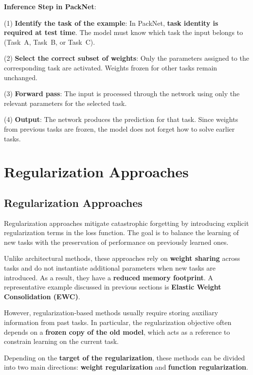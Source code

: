 \textbf{Inference Step in PackNet}:

(1) \textbf{Identify the task of the example}: In PackNet, \textbf{task identity is required at
test time}. The model must know which task the input belongs to (Task~A, Task~B, or Task~C).

(2) \textbf{Select the correct subset of weights}: Only the parameters assigned to the
corresponding task are activated. Weights frozen for other tasks remain unchanged.

(3) \textbf{Forward pass}: The input is processed through the network using only the relevant
parameters for the selected task.

(4) \textbf{Output}: The network produces the prediction for that task. Since weights from
previous tasks are frozen, the model does not forget how to solve earlier tasks.

\section{Regularization Approaches}
\subsection{Regularization Approaches}

Regularization approaches mitigate catastrophic forgetting by introducing explicit
regularization terms in the loss function. The goal is to balance the learning of new
tasks with the preservation of performance on previously learned ones.

Unlike architectural methods, these approaches rely on \textbf{weight sharing} across
tasks and do not instantiate additional parameters when new tasks are introduced.
As a result, they have a \textbf{reduced memory footprint}. A representative example
discussed in previous sections is \textbf{Elastic Weight Consolidation (EWC)}.

However, regularization-based methods usually require storing auxiliary information
from past tasks. In particular, the regularization objective often depends on a
\textbf{frozen copy of the old model}, which acts as a reference to constrain learning
on the current task.

Depending on the \textbf{target of the regularization}, these methods can be divided
into two main directions: \textbf{weight regularization} and \textbf{function
regularization}.


